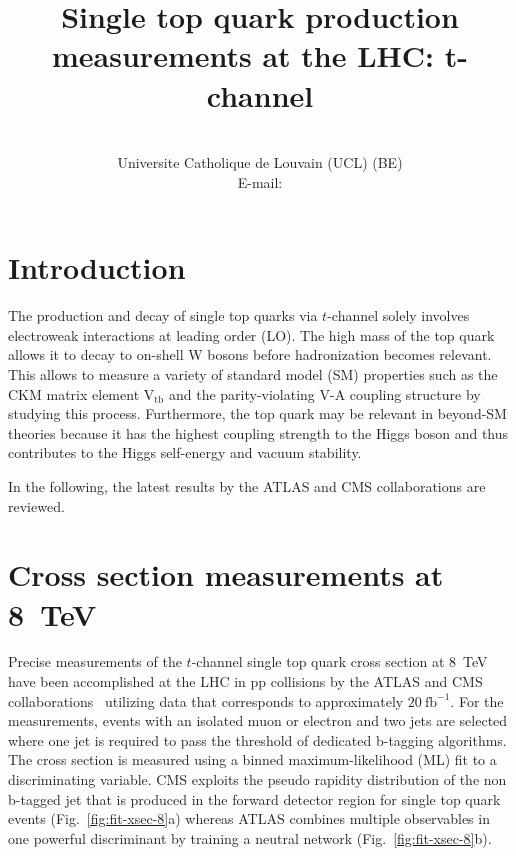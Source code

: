 \documentclass{PoS}
\title{Single top quark production measurements at the LHC: t-channel}
\author{
    \speaker{Matthias Komm}\\
    Universite Catholique de Louvain (UCL) (BE)\\
    E-mail: \email{Matthias.Komm@cern.ch}
}
\begin{document}
\section{Introduction}
The production and decay of single top quarks via $t$-channel solely involves electroweak interactions at leading order (LO). The high mass of the top quark allows it to decay to on-shell W bosons before hadronization becomes relevant. This allows to measure a variety of standard model (SM) properties such as the CKM matrix element $\mathrm{V_{tb}}$ and the parity-violating V-A coupling structure by studying this process. Furthermore, the top quark may be relevant in beyond-SM theories because it has the highest coupling strength to the Higgs boson and thus contributes to the Higgs self-energy and vacuum stability.

In the following, the latest results by the ATLAS and CMS collaborations are reviewed.

\section{Cross section measurements at 8~TeV}
Precise measurements of the $t$-channel single top quark cross section at 8~TeV have been accomplished at the LHC in pp collisions by the ATLAS and CMS collaborations~\cite{atlas-xsec8,cms-xsec8} utilizing data that corresponds to approximately $20~\mathrm{fb}^{-1}$. For the measurements, events with an isolated muon or electron and two jets are selected where one jet is required to pass the threshold of dedicated b-tagging algorithms. The cross section is measured using a binned maximum-likelihood (ML) fit to a discriminating variable. CMS exploits the pseudo rapidity distribution of the non b-tagged jet that is produced in the forward detector region for single top quark events (Fig.~\ref{fig:fit-xsec-8}a) whereas ATLAS combines multiple observables in one powerful discriminant by training a neutral network (Fig.~\ref{fig:fit-xsec-8}b).
\end{document}

